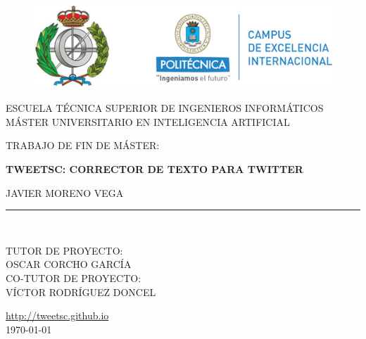 \documentclass[14pt]{extarticle}
\theoremstyle{definition}
\theoremstyle{remark}
\begin{document}
\begin{titlepage}

\begin{center}
\vspace*{-1in}
\begin{figure}[htb]
\begin{center}
\includegraphics[scale=0.8]{logoUPM.jpg}
\end{center}
\end{figure}
ESCUELA TÉCNICA SUPERIOR DE INGENIEROS INFORMÁTICOS\\
\vspace*{0.15in}
MÁSTER UNIVERSITARIO EN INTELIGENCIA ARTIFICIAL \\
\vspace*{0.6in}
\begin{large}
TRABAJO DE FIN DE MÁSTER:\\
\end{large}
\vspace*{0.2in}
\begin{Large}
\textbf{TWEETSC: CORRECTOR DE TEXTO PARA TWITTER} \\
\end{Large}
\vspace*{0.3in}
\begin{large}
JAVIER MORENO VEGA\\
\end{large}
\vspace*{0.3in}
\rule{80mm}{0.1mm}\\
\vspace*{0.1in}
\begin{large}
TUTOR DE PROYECTO: \\
OSCAR CORCHO GARCÍA \\
\vspace*{0.3in}
CO-TUTOR DE PROYECTO: \\
VÍCTOR RODRÍGUEZ DONCEL \\
\end{large}
\vspace*{2in}
\url{http://tweetsc.github.io}
\vspace*{0.2in}\\
\today
\end{center}
\end{titlepage}
\newpage
\tableofcontents %
\cleardoublepage
\end{document}
